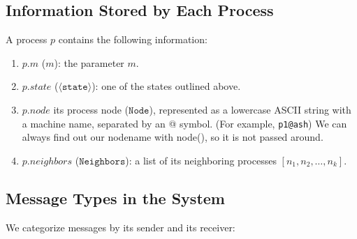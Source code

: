 \documentclass[11pt]{article}
\begin{document}
\subsection{Information Stored by Each Process}
A process $p$ contains the following information:
\begin{enumerate}
\item $p.m$ ($m$): the parameter $m$.
\item $p.state$ ($\langle\texttt{state}\rangle$): one of the \numStates states outlined above.
\item $p.node$ its process node ($\texttt{Node}$), represented as a lowercase ASCII string with a machine name, separated by an @ symbol. (For example, \texttt{p1@ash}) We can always find out our nodename with node(), so it is not passed around.
\item $p.neighbors$ ($\texttt{Neighbors}$): a list of its neighboring processes $[n_1, n_2, \ldots, n_k]$.
\end{enumerate}

\subsection{Message Types in the System}
We categorize messages by its sender and its receiver:
\end{document}
